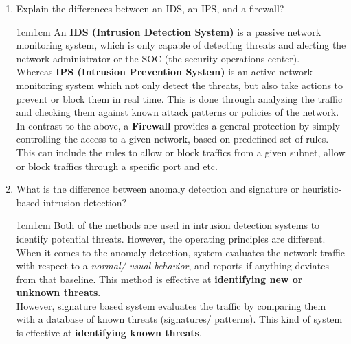 \documentclass[11pt,letterpaper]{article}
\newenvironment{answer}{\em \color{blue} \begin{adjustwidth}{1cm}{1cm}}{\end{adjustwidth}}
\begin{document}
\begin{enumerate}
\begin{table}[htbp]
\begin{tabularx}{0.8\columnwidth}{|X|X|}
			\end{tabularx}
		\end{table}
		\pagebreak
		\item Explain the differences between an IDS, an IPS, and a firewall?
		
		\begin{answer}
			 An \textbf{IDS (Intrusion Detection System)}  is a passive network monitoring system, which is only capable of detecting threats and alerting the network administrator or the SOC (the security operations center).\\
			 
			 Whereas \textbf{IPS (Intrusion Prevention System)} is an active network monitoring system which not only detect the threats, but also take actions to prevent or block them in real time. This is done through analyzing the traffic and checking them against known attack patterns or policies of the network.\\
			 
			 In contrast to the above, a \textbf{Firewall} provides a general protection by simply controlling the access to a given network, based on predefined set of rules. This can include the rules to allow or block traffics from a given subnet, allow or block traffics through a specific port and etc.
		\end{answer}
		
		\item What is the difference between anomaly detection and signature or heuristic-based intrusion detection?
		
		\begin{answer}
			Both of the methods are used in intrusion detection systems to identify potential threats. However, the operating principles are different.\\
			
			When it comes to the anomaly detection, system evaluates the network traffic with respect to a \textit{normal/ usual behavior}, and reports if anything deviates from that baseline. This method is effective at \textbf{identifying new or unknown threats}.\\ 
			
			However, signature based system evaluates the traffic by comparing them with a database of known threats (signatures/ patterns). This kind of system is effective at \textbf{identifying known threats}.
		\end{answer}
		
	\end{enumerate}
	
\end{document}

